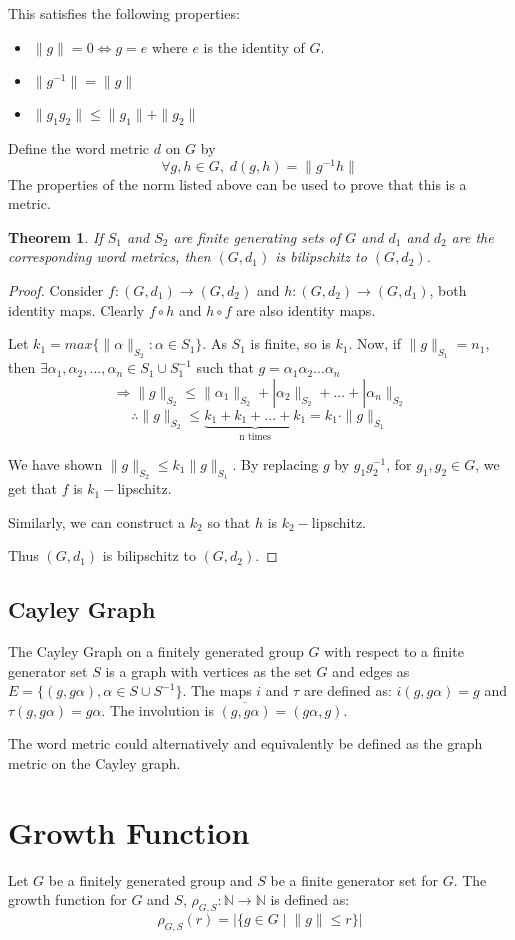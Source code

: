 \documentclass{article}
\newtheorem*{theorem}{Theorem}
\begin{document}
This satisfies the following properties:
\begin{itemize}
\item $\|g\| = 0\Leftrightarrow g=e$ where $e$ is the identity of $G$.
\item $\|g^{-1}\|=\|g\|$
\item $\|g_1g_2\|\leq \|g_1\|+\|g_2\|$
\end{itemize}
Define the word metric $d$ on $G$ by \[\forall g,h\in G,\; d(g,h)=\|g^{-1}h\|\]
The properties of the norm listed above can be used to prove that this is a metric.
\begin{theorem}
If $S_1$ and $S_2$ are finite generating sets of $G$ and $d_1$ and $d_2$ are the corresponding word metrics, then $(G,d_1)$ is bilipschitz to $(G,d_2)$.
\end{theorem}
\begin{proof}
Consider $f:(G,d_1)\rightarrow(G,d_2)$ and $h:(G,d_2)\rightarrow(G,d_1)$, both identity maps. Clearly $f\circ h$ and $h\circ f$ are also identity maps.

Let $k_1=max\{\|\alpha\|_{S_2}:\alpha\in S_1\}.$
As $S_1$ is finite, so is $k_1$.
Now, if $\|g\|_{S_1}=n_1$, then $\exists \alpha_1, \alpha_2,...,\alpha_n \in S_1\cup S^{-1}_1$ such that $g=\alpha_1 \alpha_2 ...\alpha_n$
\[\Rightarrow \|g\|_{S_2} \leq \|\alpha_1 \|_{S_2} + |\alpha_2\|_{S_2}+...+|\alpha_n\|_{S_2}\]
\[\therefore\|g\|_{S_2}\leq \underbrace{k_1+k_1+...+k_1}_{\text{n times}}=k_1\cdot\|g\|_{S_1}\]

We have shown $\|g\|_{S_2}\leq k_1\|g\|_{S_1}.$ By replacing $g$ by $g_1 g^{-1}_2$, for $g_1,g_2\in G$, we get that $f$ is $k_1 -$lipschitz.

Similarly, we can construct a $k_2$ so that $h$ is $k_2 -$lipschitz.

Thus $(G,d_1)$ is bilipschitz to $(G,d_2)$.
\end{proof}
\subsection*{Cayley Graph}
The Cayley Graph on a finitely generated group $G$ with respect to a finite generator set $S$ is a graph with vertices as the set $G$ and edges as $E = \{(g, g\alpha ), \alpha \in S\cup S^{-1}\}$. The maps $i$ and $\tau$ are defined as: $i(g,g\alpha )=g$ and $\tau (g,g\alpha )=g\alpha$. The involution is $\overline{(g,g\alpha)}=(g\alpha,g)$.

The word metric could alternatively and equivalently be defined as the graph metric on the Cayley graph.
\section{Growth Function}
Let $G$ be a finitely generated group and $S$ be a finite generator set for $G$.
The growth function for $G$ and $S$, $\rho_{G,S}:\mathbb{N}\rightarrow\mathbb{N}$ is defined as:
\[\rho_{G,S}(r)=|\{g\in G\; \vert\; \|g\|\leq r \}|\]
\end{document}
